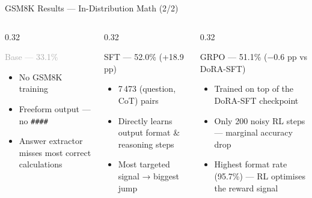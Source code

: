 \documentclass[aspectratio=169,10pt]{beamer}
\begin{document}
\begin{frame}{GSM8K Results — In-Distribution Math (2/2)}
  \begin{columns}[T]
    \begin{column}{0.32\textwidth}
      \begin{block}{\textcolor{darkgray}{Base — 33.1\%}}
        \begin{itemize}\small
          \item No GSM8K training
          \item Freeform output — no \texttt{\#\#\#\#}
          \item Answer extractor misses most correct calculations
        \end{itemize}
      \end{block}
    \end{column}
    \begin{column}{0.32\textwidth}
      \begin{block}{\textcolor{sftoran}{SFT — 52.0\% (+18.9 pp)}}
        \begin{itemize}\small
          \item 7\,473 (question, CoT) pairs
          \item Directly learns output format \& reasoning steps
          \item Most targeted signal → biggest jump
        \end{itemize}
      \end{block}
    \end{column}
    \begin{column}{0.32\textwidth}
      \begin{block}{\textcolor{grpogre}{GRPO — 51.1\% ($-0.6$ pp vs DoRA-SFT)}}
        \begin{itemize}\small
          \item Trained on top of the DoRA-SFT checkpoint
          \item Only 200 noisy RL steps — marginal accuracy drop
          \item Highest format rate (95.7\%) — RL optimises the reward signal
        \end{itemize}
      \end{block}
    \end{column}
  \end{columns}
\end{frame}
\end{document}

